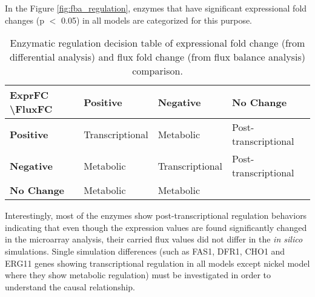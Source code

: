  In the Figure \ref{fig:fba_regulation}, enzymes that have significant expressional fold changes (p $<$ 0.05) in all models are categorized for this purpose.

\baselineskip
\begin{table}[H]
\begin{center}
\caption[Enzymatic regulation decision table of expressional fold change (from differential analysis) and flux fold change (from flux balance analysis) comparison.]{Enzymatic regulation decision table \cite{bordel2010sampling} of expressional fold change (from differential analysis) and flux fold change (from flux balance analysis) comparison.}
\baselineskip
\label{table:regulation_table}
\begin{tabular}{l|l|l|l|}
\cline{2-4}
\textbf{ExprFC \textbackslash FluxFC} & \textbf{Positive} & \textbf{Negative} & \textbf{No Change} \\ \hline
\multicolumn{1}{|l|}{\textbf{Positive}}  & Transcriptional & Metabolic       & Post-transcriptional \\ \hline
\multicolumn{1}{|l|}{\textbf{Negative}}  & Metabolic       & Transcriptional & Post-transcriptional \\ \hline
\multicolumn{1}{|l|}{\textbf{No Change}} & Metabolic       & Metabolic       &                      \\ \hline
\end{tabular}
\end{center}
\end{table}

Interestingly, most of the enzymes show post-transcriptional regulation behaviors indicating that even though the expression values are found significantly changed in the microarray analysis, their carried flux values did not differ in the \emph{in silico} simulations. Single simulation differences (such as FAS1, DFR1, CHO1 and ERG11 genes showing transcriptional regulation in all models except nickel model where they show metabolic regulation) must be investigated in order to understand the causal relationship.



